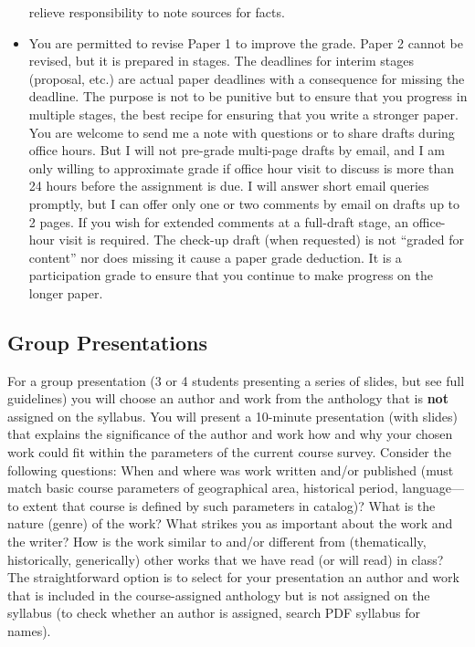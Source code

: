 \documentclass[]{article}
\begin{document}
\begin{itemize}
  relieve responsibility to note sources for facts.
\item
  You are permitted to revise Paper 1 to improve the grade. Paper 2
  cannot be revised, but it is prepared in stages. The deadlines for
  interim stages (proposal, etc.) are actual paper deadlines with a
  consequence for missing the deadline. The purpose is not to be
  punitive but to ensure that you progress in multiple stages, the best
  recipe for ensuring that you write a stronger paper. You are welcome
  to send me a note with questions or to share drafts during office
  hours. But I will not pre-grade multi-page drafts by email, and I am
  only willing to approximate grade if office hour visit to discuss is
  more than 24 hours before the assignment is due. I will answer short
  email queries promptly, but I can offer only one or two comments by
  email on drafts up to 2 pages. If you wish for extended comments at a
  full-draft stage, an office-hour visit is required. The check-up draft
  (when requested) is not ``graded for content'' nor does missing it
  cause a paper grade deduction. It is a participation grade to ensure
  that you continue to make progress on the longer paper.
\end{itemize}

\subsection{Group Presentations}\label{group-presentations}

For a group presentation (3 or 4 students presenting a series of slides,
but see full guidelines) you will choose an author and work from the
anthology that is \textbf{not} assigned on the syllabus. You will
present a 10-minute presentation (with slides) that explains the
significance of the author and work how and why your chosen work could
fit within the parameters of the current course survey. Consider the
following questions: When and where was work written and/or published
(must match basic course parameters of geographical area, historical
period, language---to extent that course is defined by such parameters
in catalog)? What is the nature (genre) of the work? What strikes you as
important about the work and the writer? How is the work similar to
and/or different from (thematically, historically, generically) other
works that we have read (or will read) in class? The straightforward
option is to select for your presentation an author and work that is
included in the course-assigned anthology but is not assigned on the
syllabus (to check whether an author is assigned, search PDF syllabus
for names).
\end{document}
